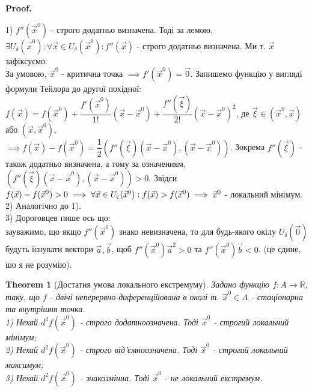 \documentclass[a4paper, 10pt]{article}
\makeatletter
\def\qed{$\blacksquare$}
\theoremstyle{theoremdd}
\newtheorem{theorem}{Theorem}[subsection]
\theoremstyle{theoremdd}
\theoremstyle{theoremdd}
\theoremstyle{theoremdd}
\theoremstyle{theoremdd}
\theoremstyle{theoremdd}
\theoremstyle{theoremdd}
\theoremstyle{theoremdd}
\theoremstyle{theoremdd}
\renewenvironment{proof}[1][Proof.\\]{\par
\pushQED{\hfill \qed}%
\normalfont \topsep6\p@\@plus6\p@\relax
\trivlist
\item\relax
{\bfseries
#1\@addpunct{.}}\hspace\labelsep\ignorespaces
}{%
\popQED\endtrivlist\@endpefalse
}
\makeatother
\begin{document}
\begin{proof}
1) $f''(\vec{x}^0)$ - строго додатньо визначена. Тоді за лемою, $\exists U_{\delta}(\vec{x}^0): \forall \vec{x} \in U_{\delta}(\vec{x}^0): f''(\vec{x})$ - строго додатньо визначена. Ми т. $\vec{x}$ зафіксуємо.\\
За умовою, $\vec{x}^0$ - критична точка $\implies f'(\vec{x}^0) = \vec{0}$. Запишемо функцію у вигляді формули Тейлора до другої похідної:\\
$f(\vec{x}) = f(\vec{x}^0) + \dfrac{f'(\vec{x}^0)}{1!}(\vec{x}-\vec{x}^0) + \dfrac{f''(\vec{\xi})}{2!}(\vec{x}-\vec{x}^0)^2$, де $\vec{\xi} \in (\vec{x}^0,\vec{x})$ або $(\vec{x},\vec{x}^0)$.\\
$\implies f(\vec{x}) - f(\vec{x}^0) = \dfrac{1}{2} \left(f''(\vec{\xi})(\vec{x}-\vec{x}^0), (\vec{x}-\vec{x}^0) \right)$. Зокрема $f''(\vec{\xi})$ - також додатньо визначена, а тому за означенням, $\left( f''(\vec{\xi})(\vec{x}-\vec{x}^0),(\vec{x}-\vec{x}^0) \right) > 0$. Звідси $f(\vec{x})-f(\vec{x}^0) > 0 \\ \implies \forall \vec{x} \in U_{\varepsilon}(\vec{x}^0): f(\vec{x}) > f(\vec{x}^0) \implies \vec{x}^0$ - локальний мінімум.
\bigskip \\

2) Аналогічно до 1).
\bigskip \\

3) Дороговцев пише ось що:\\
зауважимо, що якщо $f''(\vec{x}^0)$ знако невизначена, то для будь-якого окілу $U_\delta (\vec{0})$ будуть існувати вектори $\vec{a}, \vec{b}$, щоб $f''(\vec{x}^0) \vec{a}^2 > 0$ та $f''(\vec{x}^0) \vec{b} < 0$. (це єдине, шо я не розумію).

\end{proof}
\fi

\begin{theorem}[Достатня умова локального екстремуму]
Задано функцію $f: A \to \mathbb{R}$, таку, що $f$ - двічі неперервно-диференційована в околі т. $\vec{x}^0 \in A$ - стаціонарна та внутрішня точка.\\
1) Нехай $d^2 f(\vec{x}^0)$ - строго додатноозначена. Тоді $\vec{x}^0$ - строгий локальний мінімум;\\
2) Нехай $d^2 f(\vec{x}^0)$ - строго від'ємноозначена. Тоді $\vec{x}^0$ - строгий локальний максимум;\\
3) Нехай $d^2 f(\vec{x}^0)$ - знакозмінна. Тоді $\vec{x}^0$ - не локальний екстремум.
\end{theorem}
\end{document}

